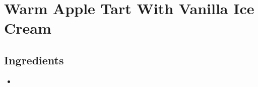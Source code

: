 \thispagestyle{fancy}
\section{Warm Apple Tart With Vanilla Ice Cream}
\AddToShipoutPicture*{\AppleTart}

\subsection*{Ingredients}
\begin{multicols}{3}
	\begin{itemize}
		\item 
	\end{itemize}
\end{multicols}